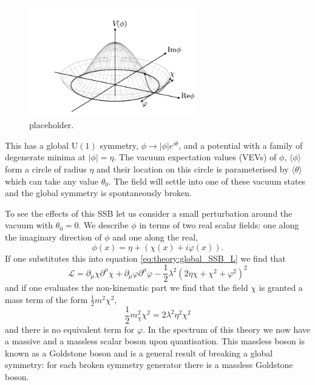 \begin{figure}[h!]
    \includegraphics[width=0.65\textwidth]{figures/theory/ssb_potential.pdf}
    \caption{placeholder.}
    \label{fig:theory:global_ssb_potential}
\end{figure}
This has a global $\mathrm{U}(1)$ symmetry, $\phi\rightarrow|\phi|e^{i\theta}$, and a potential with a family of degenerate minima at $|\phi| = \eta$. The vacuum expectation values (VEVs) of $\phi$, $\langle\phi\rangle$ form a circle of radius $\eta$ and their location on this circle is parameterised by $\langle\theta\rangle$ which can take any value $\theta_{0}$. The field will settle into one of these vacuum states and the global symmetry is spontaneously broken.

To see the effects of this SSB let us consider a small perturbation around the vacuum with $\theta_{0}=0$. We describe $\phi$ in terms of two real scalar fields: one along the imaginary direction of $\phi$ and one along the real,
\begin{equation}
    \phi(x) = \eta + (\chi(x) + i\varphi(x)).
\end{equation}
If one substitutes this into equation \ref{eq:theory:global_SSB_L} we find that
\begin{equation}
    \mathcal{L} = \partial_{\mu}\chi\partial^{\mu}\chi + \partial_{\mu}\varphi\partial^{\mu}\varphi - \frac{1}{2}\lambda^{2}(2\eta\chi + \chi^{2} + \varphi^{2})^{2} 
\end{equation}
and if one evaluates the non-kinematic part we find that the field $\chi$ is granted a mass term of the form $\frac{1}{2}m^{2}\chi^{2}$,
\begin{equation}
    \frac{1}{2}m_{\chi}^{2}\chi^{2} = 2\lambda^{2}\eta^{2}\chi^{2}
\end{equation}
and there is no equivalent term for $\varphi$. In the spectrum of this theory we now have a massive and a massless scalar boson upon quantisation. This massless boson is known as a Goldstone boson and is a general result of breaking a global symmetry: for each broken symmetry generator there is a massless Goldstone boson. 


